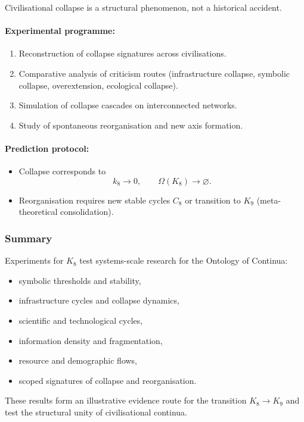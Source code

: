 Civilisational collapse is a structural phenomenon, not a historical accident.

\paragraph{Experimental programme:}

\begin{enumerate}
    \item Reconstruction of collapse signatures across civilisations.
    \item Comparative analysis of criticism routes
          (infrastructure collapse, symbolic collapse,
           overextension, ecological collapse).
    \item Simulation of collapse cascades on interconnected networks.
    \item Study of spontaneous reorganisation and new axis formation.
\end{enumerate}

\paragraph{Prediction protocol:}

\begin{itemize}
    \item Collapse corresponds to
          \[
             k_8 \rightarrow 0,\qquad \Omega(K_8) \rightarrow \varnothing.
          \]
    \item Reorganisation requires new stable cycles $C_8$
          or transition to $K_9$ (meta-theoretical consolidation).
\end{itemize}



\subsubsection{Summary}

Experiments for $K_8$ test systems-scale research for the Ontology of Continua:

\begin{itemize}
    \item symbolic thresholds and stability,
    \item infrastructure cycles and collapse dynamics,
    \item scientific and technological cycles,
    \item information density and fragmentation,
    \item resource and demographic flows,
    \item scoped signatures of collapse and reorganisation.
\end{itemize}

These results form an illustrative evidence route for the transition $K_8 \rightarrow K_9$
and test the structural unity of civilisational continua.
